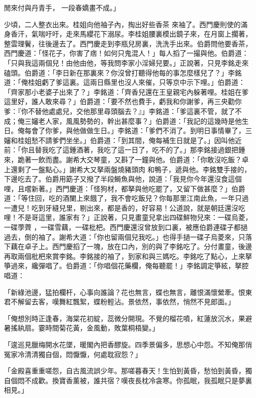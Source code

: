 閒來付與丹青手，  一段春嬌畫不成。」

少頃，二人整衣出來。桂姐向他袖子內，掏出好些香茶 來袖了。西門慶則使的滿身香汗，氣喘吁吁，走來馬纓花下溺尿。李桂姐腰裏模出鏡子來，在月窗上擱著，整雲理鬢，往後邊去了。西門慶走到李瓶兒房裏，洗洗手出來。伯爵問他要香茶，西門慶道：「怪花子，你害了痞！如何只鬼混人！」每人搯了一撮與他。伯爵道：「只與我這兩個兒！由他由他，等我問李家小淫婦兒要。」正說著，只見李銘走來磕頭。伯爵道：「李日新在那裏來？你沒曾打聽得他每的事怎麼樣兒了？」李銘道：「俺桂姐虧了爹這裏。這兩日縣里也沒人來催，只等京中示下哩。」伯爵道：「齊家那小老婆子出來了？」李銘道：「齊香兒還在王皇親宅內躲著哩。桂姐在爹這里好，誰人敢來尋？」伯爵道：「要不然也費手，虧我和你謝爹，再三央勸你爹：『你不替他處處兒，交他那里尋頭腦去？』」李銘道：「爹這裏不管，就了不成；俺三嬸老人家，風風勢勢的，幹出甚麼事？」伯爵道：「我記的這幾時是他生日。俺每會了你爹，與他做做生日。」李銘道：「爹們不消了。到明日事情畢了，三嬸和桂姐愁不請爹們坐坐。」伯爵道：「到其間，俺每補生日就是了。」因叫他近前：「你且替我吃了這鍾酒著，我吃了這一日了，吃不的了。」那李銘接過銀把鍾來，跪著一飲而盡。謝希大交琴童，又斟了一鐘與他。伯爵道：「你敢沒吃飯？卓上還剩了一盤點心。」謝希大又拏兩盤燒豬頭肉 和鴨子，遞與他。李銘雙手接的，下邊吃去了。伯爵用筯子又撥了半段鰣魚與他，說道：「我見你今年還沒食這個哩，且嚐新著。」西門慶道：「怪狗材，都拏與他吃罷了，又留下做甚麼？」伯爵道：「等住回，吃的酒闌上來餓了，我不會吃飯兒？你每那里江南此魚，一年只過一遭兒！吃到牙縫兒里，剔出來，都是香的，好容易！公道說，就是朝廷還沒吃哩！不是哥這里，誰家有？」正說著，只見畫童兒拿出四碟鮮物兒來：一碟烏菱，一碟荸薺 ，一碟雪藕，一碟枇杷。西門慶還沒曾放到口裏，被應伯爵連碟子都撾過去，倒的袖了。謝希大道：「你也留兩個兒我吃。」也得手撾一碟子烏菱來，只落下藕在卓子上。西門慶搯了一塊，放在口內，別的與了李銘吃了。分付畫童，後邊再取兩個枇杷來賞李銘。李銘接的袖了，到家和與三媽吃。李銘吃了點心，上來拏箏過來，纔彈唱了。伯爵道：「你唱個花藥欄，俺每聽罷！」李銘調定箏絃，拏腔唱道：

「新綠池邊，猛拍欄杆，心事向誰論？花也無言，蝶也無言，離恨滿懷縈牽。恨東君不解留去客，嘆舞紅飄絮，蝶粉輕沾。景依然，事依然，悄然不見郎面。」

「俺想別時正逢春，海棠花初綻，蕊微分開現。不覺的榴花噴，紅蓮放沉水，果避暑搖紈扇。霎時間菊花黃，金風動，敗葉桐梧變。」

「逡巡見臘梅開水花墜，暖閣內把香醪旋。四季景偏多，思想心中怨。不知俺那俏冤家冷清清獨自個，悶懨懨，何處耽寂怨？」

「金殿喜重重嗟怨，自古風流誤少年。那嗟暮春天！生怕到黃昏，愁怕到黃昏，獨自個悶不成歡。換寶香薰被，誰共宿？嘆夜長枕冷衾寒。你孤眠，我孤眠只是夢裏相見。」

